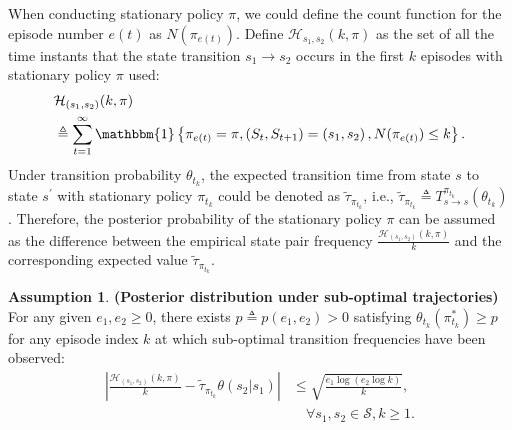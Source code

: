 \documentclass{article}
\theoremstyle{plain}
\theoremstyle{definition}
\newtheorem{assumption}[theorem]{Assumption}
\theoremstyle{remark}
\begin{document}
When conducting stationary policy $\pi$, we could define the count function for the episode number $e(t)$ as $N(\pi_{e(t)})$. Define $\mathcal{H}_{s_{1},s_{2}}(k,\pi)$ as the set of all the time instants that the state transition $s_{1} \rightarrow s_{2}$ occurs in the first $k$ episodes with stationary policy $\pi$ used:
\begin{equation}
\begin{aligned}
&\mathcal{H}_{\left(s_{1}, s_{2}\right)}(k, \pi) \\
&\triangleq\sum_{t=1}^{\infty} \mathbbm{1}\left\{\pi_{e(t)}=\pi,\left(S_{t}, S_{t+1}\right)=\left(s_{1}, s_{2}\right), N(\pi_{e(t)}) \leq k\right\}.
\end{aligned}
\end{equation}
Under transition probability $\theta_{t_{k}}$, the expected transition time from state $s$ to state $s^{\prime}$ with stationary policy $\pi_{t_{k}}$ could be denoted as $\tilde\tau_{\pi_{t_{k}}}$, i.e., $\tilde\tau_{\pi_{t_{k}}} \triangleq T_{s \rightarrow s}^{\pi_{t_{k}}}(\theta_{t_{k}})$. Therefore, the posterior probability of the stationary policy $\pi$ can be assumed as the difference between the empirical state pair frequency $\frac{\mathcal{H}_{\left(s_{1}, s_{2}\right)}\left(k, \pi\right)}{k}$ and the corresponding expected value $\tilde\tau_{\pi_{t_{k}}}$.
\begin{assumption}
\label{assumption3}
\textbf{(Posterior distribution under sub-optimal trajectories)} \citep{gopalan2015thompson} For any given $e_1,e_2 \geq 0$, there exists $p \triangleq p(e_1,e_2) > 0$ satisfying $\theta_{t_{k}}(\pi_{t_{k}}^{*}) \geq p$ for any episode index $k$ at which sub-optimal transition frequencies have been observed:
$$
\begin{aligned}
\left|\frac{\mathcal{H}_{\left(s_{1}, s_{2}\right)}\left(k, \pi\right)}{k} - \tilde{\tau}_{\pi_{t_{k}}}\theta \left(s_{2}|s_{1}\right)\right| &\leq \sqrt{\frac{e_{1} \log \left(e_{2} \log k\right)}{k}}, \\
&\quad\forall s_{1}, s_{2} \in \mathcal{S}, k \geq 1.
\end{aligned}
$$
\end{assumption}
\end{document}
